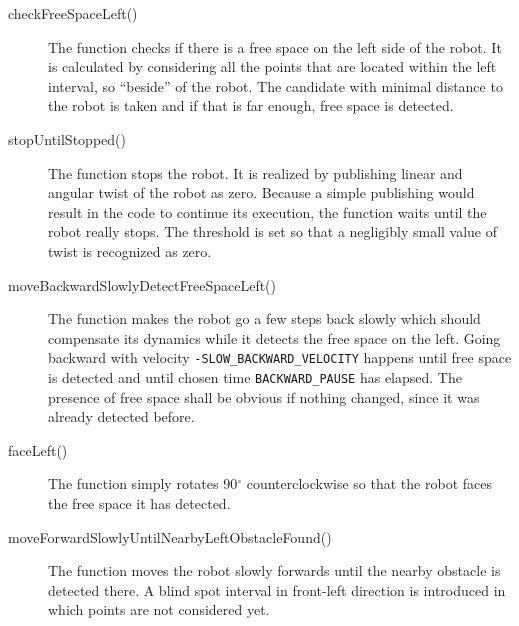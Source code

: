 \begin{description}
\item[checkFreeSpaceLeft()] The function checks if there is a free space on the left side of the robot. It is calculated by considering all the points that are located within the left interval, so ``beside'' of the robot. The candidate with minimal distance to the robot is taken and if that is far enough, free space is detected.
\item[stopUntilStopped()] The function stops the robot. It is realized by publishing linear and angular twist of the robot as zero. Because a simple publishing would result in the code to continue its execution, the function waits until the robot really stops. The threshold is set so that a negligibly small value of twist is recognized as zero.
\item[moveBackwardSlowlyDetectFreeSpaceLeft()] The function makes the robot go a few steps back slowly which should compensate its dynamics while it detects the free space on the left. Going backward with velocity  \texttt{-SLOW\_BACKWARD\_VELOCITY} happens until free space is detected and until chosen time \texttt{BACKWARD\_PAUSE} has elapsed. The presence of free space shall be obvious if nothing changed, since it was already detected before.
\item[faceLeft()] The function simply rotates 90$^{\circ}$ counterclockwise so that the robot faces the free space it has detected.
\item[moveForwardSlowlyUntilNearbyLeftObstacleFound()] The function moves the robot slowly forwards until the nearby obstacle is detected there. A blind spot interval in front-left direction is introduced in which points are not considered yet.


\end{description}
